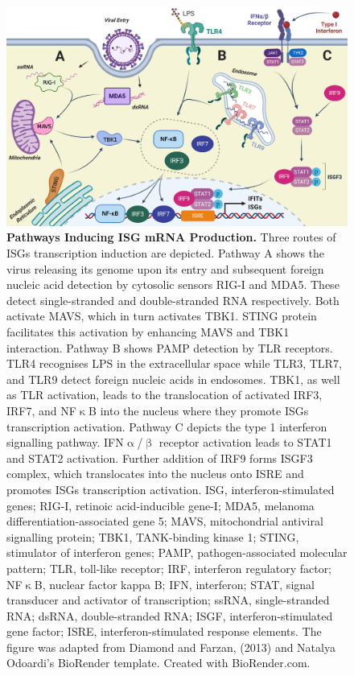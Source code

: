 \begin{figure}
    \centering
    \includegraphics[width=1\linewidth]{04. Introduction//Figs/01. IFIT transcription activation figure.png}
    \caption[Pathways Inducing ISG mRNA Production.]{\textbf{Pathways Inducing ISG mRNA Production.} Three routes of ISGs transcription induction are depicted. Pathway A shows the virus releasing its genome upon its entry and subsequent foreign nucleic acid detection by cytosolic sensors RIG-I and MDA5. These detect single-stranded and double-stranded RNA respectively. Both activate MAVS, which in turn activates TBK1. STING protein facilitates this activation by enhancing MAVS and TBK1 interaction. Pathway B shows PAMP detection by TLR receptors. TLR4 recognises LPS in the extracellular space while TLR3, TLR7, and TLR9 detect foreign nucleic acids in endosomes. TBK1, as well as TLR activation, leads to the translocation of activated IRF3, IRF7, and NF$\upkappa$B into the nucleus where they promote ISGs transcription activation. Pathway C depicts the type 1 interferon signalling pathway. IFN$\upalpha$/$\upbeta$ receptor activation leads to STAT1 and STAT2 activation. Further addition of IRF9 forms ISGF3 complex, which translocates into the nucleus onto ISRE and promotes ISGs transcription activation. ISG, interferon-stimulated genes; RIG-I, retinoic acid-inducible gene-I; MDA5, melanoma differentiation-associated gene 5; MAVS, mitochondrial antiviral signalling protein; TBK1, TANK-binding kinase 1; STING, stimulator of interferon genes; PAMP, pathogen-associated molecular pattern; TLR, toll-like receptor; IRF, interferon regulatory factor; NF$\upkappa$B, nuclear factor kappa B; IFN, interferon; STAT, signal transducer and activator of transcription; ssRNA, single-stranded RNA; dsRNA, double-stranded RNA; ISGF, interferon-stimulated gene factor; ISRE, interferon-stimulated response elements. The figure was adapted from Diamond and Farzan, (2013) \cite{Diamond2013TheProteins} and Natalya Odoardi's BioRender template. Created with BioRender.com.}
    \label{fig:Pathways Inducing ISG mRNA Production.}
\end{figure}

